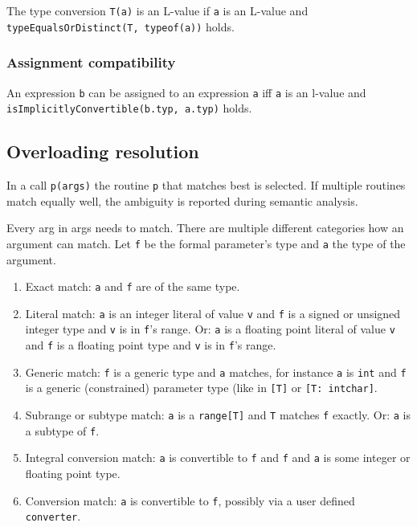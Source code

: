The type conversion \texttt{T(a)} is an L-value if \texttt{a} is an
L-value and \texttt{typeEqualsOrDistinct(T,\ typeof(a))} holds.

\hypertarget{assignment-compatibility}{%
\subsubsection{Assignment
compatibility}\label{assignment-compatibility}}

An expression \texttt{b} can be assigned to an expression \texttt{a} iff
\texttt{a} is an {l-value} and
\texttt{isImplicitlyConvertible(b.typ,\ a.typ)} holds.

\hypertarget{overloading-resolution}{%
\subsection{Overloading resolution}\label{overloading-resolution}}

In a call \texttt{p(args)} the routine \texttt{p} that matches best is
selected. If multiple routines match equally well, the ambiguity is
reported during semantic analysis.

Every arg in args needs to match. There are multiple different
categories how an argument can match. Let \texttt{f} be the formal
parameter's type and \texttt{a} the type of the argument.

\begin{enumerate}
\def\labelenumi{\arabic{enumi}.}
\tightlist
\item
  Exact match: \texttt{a} and \texttt{f} are of the same type.
\item
  Literal match: \texttt{a} is an integer literal of value \texttt{v}
  and \texttt{f} is a signed or unsigned integer type and \texttt{v} is
  in \texttt{f}'s range. Or: \texttt{a} is a floating point literal of
  value \texttt{v} and \texttt{f} is a floating point type and
  \texttt{v} is in \texttt{f}'s range.
\item
  Generic match: \texttt{f} is a generic type and \texttt{a} matches,
  for instance \texttt{a} is \texttt{int} and \texttt{f} is a generic
  (constrained) parameter type (like in \texttt{{[}T{]}} or
  \texttt{{[}T:\ int\textbar{}char{]}}.
\item
  Subrange or subtype match: \texttt{a} is a \texttt{range{[}T{]}} and
  \texttt{T} matches \texttt{f} exactly. Or: \texttt{a} is a subtype of
  \texttt{f}.
\item
  Integral conversion match: \texttt{a} is convertible to \texttt{f} and
  \texttt{f} and \texttt{a} is some integer or floating point type.
\item
  Conversion match: \texttt{a} is convertible to \texttt{f}, possibly
  via a user defined \texttt{converter}.
\end{enumerate}

